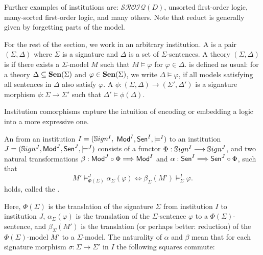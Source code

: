 \documentclass[10pt,fleqn,%
\ifpretendfinal
final%
\else
draft%
\fi,
]{scrreprt}
\begin{document}
Further examples of institutions are: $\mathcal{SROIQ}(D)$, unsorted first-order logic, 
many-sorted first-order logic, and many others.  Note that reduct is generally given by forgetting 
parts of the model.

For the rest of the section, we work in an arbitrary institution. 
A  is a pair $(\Sigma,\Delta)$ where $\Sigma$ is a signature and $\Delta$ is a set of $\Sigma$-sentences.
 A theory $(\Sigma, \Delta)$ is  if there exists a $\Sigma$-model $M$ such that
$M\models\varphi$ for $\varphi \in \Delta$.  is defined as usual: 
for  a theory $\Delta\subseteq \mathbf {Sen}(\Sigma)$ and 
$\varphi\in \mathbf {Sen}(\Sigma)$, we write $\Delta\models\varphi$, if all models satisfying all sentences in
$\Delta$ also satisfy $\varphi$. A  $\phi: (\Sigma, \Delta) \rightarrow (\Sigma',  \Delta')$ is 
   a signature morphism $\phi:\Sigma\rightarrow \Sigma'$ such that $\Delta'\models \phi(\Delta)$.

\medskip

Institution comorphisms capture the intuition of encoding or embedding a logic into a more expressive one.

\begin{definition} An  from an institution $I = (\mathbb{S}ign^I,$ $ \mathsf{Mod}^I, \mathsf{Sen}^I, \models^I)$ to an institution $J=(\mathbb{S}ign^J, \mathsf{Mod}^J,\mathsf{Sen}^J, \models^J)$ consists of a functor $\Phi : \mathbb{S}ign^I \longrightarrow \mathbb{S}ign^J$, and
two natural transformations $\beta: \mathsf{Mod}^J \circ \Phi \Longrightarrow \mathsf{Mod}^I$
and $\alpha: \mathsf{Sen}^I \Longrightarrow \mathsf{Sen}^J \circ \Phi$, such that 
$$ M'\models^{J}_{\Phi(\Sigma)}\alpha_{\Sigma}(\varphi) \Leftrightarrow
\beta_{\Sigma}(M')\models^I_{\Sigma}\varphi.
$$
holds, called the .
\end{definition}

\noindent
Here, $\Phi(\Sigma)$ is the translation of the signature $\Sigma$ from
institution $I$ to institution $J$, $\alpha_{\Sigma}(\varphi)$ is the
translation of the $\Sigma$-sentence $\varphi$ to a
$\Phi(\Sigma)$-sentence, and $\beta_{\Sigma}(M')$ is the translation
(or perhaps better: reduction) of the $\Phi(\Sigma)$-model $M'$ to a
$\Sigma$-model. The naturality of $\alpha$ and $\beta$ mean that for each
signature morphism $\sigma:\Sigma\rightarrow\Sigma'$ in $I$ the following 
squares commute:
\end{document}
